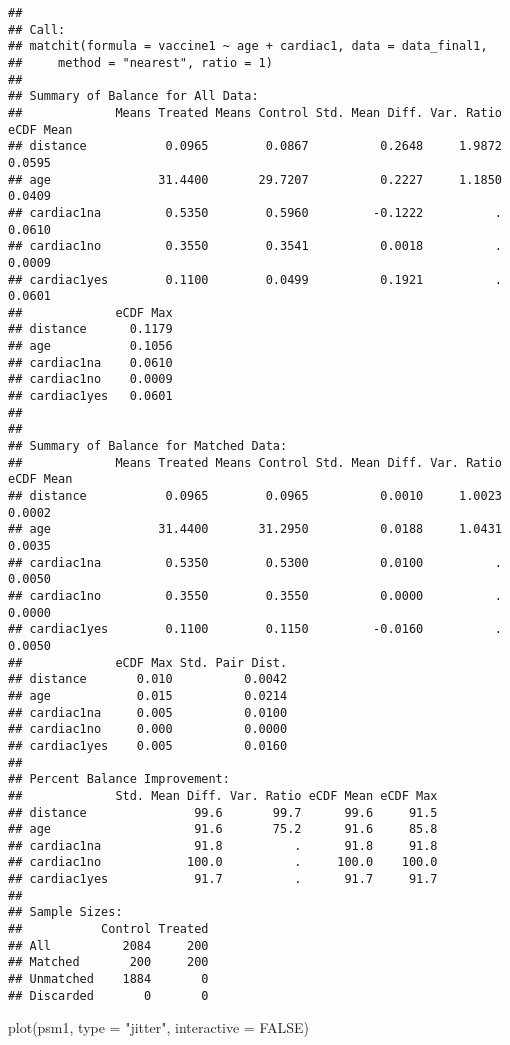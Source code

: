 \documentclass[
]{article}
\newenvironment{Shaded}{\begin{snugshade}}{\end{snugshade}}
\newcommand{\AttributeTok}[1]{\textcolor[rgb]{0.77,0.63,0.00}{#1}}
\newcommand{\ConstantTok}[1]{\textcolor[rgb]{0.00,0.00,0.00}{#1}}
\newcommand{\FunctionTok}[1]{\textcolor[rgb]{0.00,0.00,0.00}{#1}}
\newcommand{\NormalTok}[1]{#1}
\newcommand{\StringTok}[1]{\textcolor[rgb]{0.31,0.60,0.02}{#1}}
\begin{document}
\begin{verbatim}
## 
## Call:
## matchit(formula = vaccine1 ~ age + cardiac1, data = data_final1, 
##     method = "nearest", ratio = 1)
## 
## Summary of Balance for All Data:
##             Means Treated Means Control Std. Mean Diff. Var. Ratio eCDF Mean
## distance           0.0965        0.0867          0.2648     1.9872    0.0595
## age               31.4400       29.7207          0.2227     1.1850    0.0409
## cardiac1na         0.5350        0.5960         -0.1222          .    0.0610
## cardiac1no         0.3550        0.3541          0.0018          .    0.0009
## cardiac1yes        0.1100        0.0499          0.1921          .    0.0601
##             eCDF Max
## distance      0.1179
## age           0.1056
## cardiac1na    0.0610
## cardiac1no    0.0009
## cardiac1yes   0.0601
## 
## 
## Summary of Balance for Matched Data:
##             Means Treated Means Control Std. Mean Diff. Var. Ratio eCDF Mean
## distance           0.0965        0.0965          0.0010     1.0023    0.0002
## age               31.4400       31.2950          0.0188     1.0431    0.0035
## cardiac1na         0.5350        0.5300          0.0100          .    0.0050
## cardiac1no         0.3550        0.3550          0.0000          .    0.0000
## cardiac1yes        0.1100        0.1150         -0.0160          .    0.0050
##             eCDF Max Std. Pair Dist.
## distance       0.010          0.0042
## age            0.015          0.0214
## cardiac1na     0.005          0.0100
## cardiac1no     0.000          0.0000
## cardiac1yes    0.005          0.0160
## 
## Percent Balance Improvement:
##             Std. Mean Diff. Var. Ratio eCDF Mean eCDF Max
## distance               99.6       99.7      99.6     91.5
## age                    91.6       75.2      91.6     85.8
## cardiac1na             91.8          .      91.8     91.8
## cardiac1no            100.0          .     100.0    100.0
## cardiac1yes            91.7          .      91.7     91.7
## 
## Sample Sizes:
##           Control Treated
## All          2084     200
## Matched       200     200
## Unmatched    1884       0
## Discarded       0       0
\end{verbatim}

\begin{Shaded}
\begin{Highlighting}[]
\FunctionTok{plot}\NormalTok{(psm1, }\AttributeTok{type =} \StringTok{"jitter"}\NormalTok{, }\AttributeTok{interactive =} \ConstantTok{FALSE}\NormalTok{)}
\end{Highlighting}
\end{Shaded}
\end{document}
